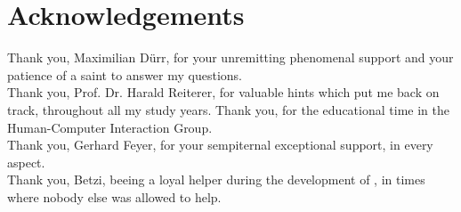 \thispagestyle{empty}
\chapter*{Acknowledgements}
\thispagestyle{empty}
\begin{center}
	Thank you, Maximilian Dürr, for your unremitting phenomenal support and your patience of a saint to answer my questions.\\
	\vspace{2cm}
	Thank you, Prof. Dr. Harald Reiterer, for valuable hints which put me back on track, throughout all my study years. Thank you, for the educational time in the Human-Computer Interaction Group.\\
	\vspace{2cm}
	Thank you, Gerhard Feyer, for your sempiternal exceptional support, in every aspect.\\
	\vspace{2cm}
	Thank you, Betzi, beeing a loyal helper during the development of \exgo, in times where nobody else was allowed to help.
\end{center}

\newpage
\thispagestyle{empty}
\ 